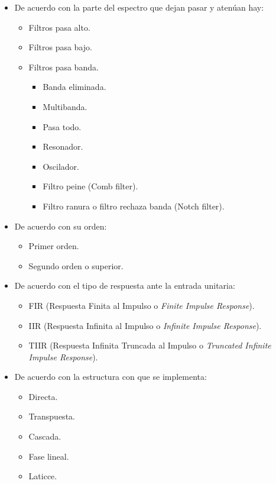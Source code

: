 \documentclass[conference]{IEEEtran}
\begin{document}
\begin{itemize}
\item De acuerdo con la parte del espectro que dejan pasar y atenúan hay:

\begin{itemize}
\item Filtros pasa alto.
\item Filtros pasa bajo.
\item Filtros pasa banda.
\begin{itemize}
\item Banda eliminada.
\item Multibanda.
\item Pasa todo.
\item Resonador.
\item Oscilador.
\item Filtro peine (Comb filter).
\item Filtro ranura o filtro rechaza banda (Notch filter).
\end{itemize}
\end{itemize}

\item De acuerdo con su orden:

\begin{itemize}
\item Primer orden.
\item Segundo orden o superior.
\end{itemize}

\item De acuerdo con el tipo de respuesta ante la entrada unitaria:

\begin{itemize}
\item FIR (Respuesta Finita al Impulso o \emph{Finite Impulse Response}).
\item IIR (Respuesta Infinita al Impulso o \emph{Infinite Impulse Response}).
\item TIIR (Respuesta Infinita Truncada al Impulso o \emph{Truncated Infinite Impulse Response}).
\end{itemize}

\item De acuerdo con la estructura con que se implementa:

\begin{itemize}
\item Directa.
\item Transpuesta.
\item Cascada.
\item Fase lineal.
\item Laticce.
\end{itemize}
\end{itemize}
\end{document}
